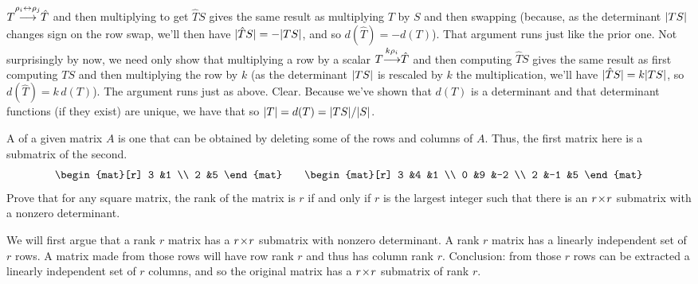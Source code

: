 \begin{exercises}
\begin{answer}
\begin{exparts}
          $
            T\smash[b]{\mathrel{ \mathop{\longrightarrow}\limits^{\rho_i\leftrightarrow\rho_j\mathstrut}_{ \begin{subarray}{l} \relax \end{subarray}}}}\hat{T}
          $
          and then multiplying to get \( \hat{T}S \) gives the same result as
          multiplying \( T \) by \( S \) and then swapping (because,
          as the determinant \( \deter{TS} \) changes sign on
          the row swap, we'll then have \( \deter{\hat{T}S}=-\deter{TS} \),
          and so \( d(\hat{T})=-d(T) \)).
          That argument runs just like the prior one.
        \partsitem Not surprisingly by now, we need only show that 
          multiplying a row by a scalar
          $
            T\smash[b]{\mathrel{ \mathop{\longrightarrow}\limits^{k\rho_i\mathstrut}_{ \begin{subarray}{l} \relax \end{subarray}}}}\hat{T}
          $
          and then computing \( \hat{T}S \) gives the same result as
          first computing \( TS \) and then multiplying the row by \( k \)
          (as the determinant \( \deter{TS} \) is rescaled by \( k \)
          the multiplication, we'll have \( \deter{\hat{T}S}=k\deter{TS} \),
          so \( d(\hat{T})=k\,d(T) \)).
          The argument runs just as above.
        \partsitem Clear.
        \partsitem Because we've shown that \( d(T) \) is a determinant
          and that determinant functions (if they exist) are
          unique, we have that
          so \( \deter{T}=d(T)=\deter{TS}/\deter{S} \).
      \end{exparts}  
    \end{answer}
  \item 
    A  
    of a given matrix $A$ is one that can be obtained by deleting 
    some of the rows and columns of $A$.
    Thus, the first matrix here is a submatrix of the second.
    \begin{equation*}
      \begin{mat}[r]
        3  &1  \\
        2  &5
      \end{mat}
      \qquad
      \begin{mat}[r]
        3  &4  &1  \\
        0  &9  &-2 \\
        2  &-1 &5
      \end{mat}
    \end{equation*}
    Prove that for any square matrix,
    the rank of the matrix is $r$ if and only if
    \( r \) is the largest
    integer such that there is an \( r \! \times \! r \) submatrix with a nonzero
    determinant.
    \begin{answer}
      We will first argue that a rank \( r \) matrix has a \( r \! \times \! r \)
      submatrix with nonzero determinant.
      A rank \( r \) matrix has a linearly independent set of \( r \) rows.
      A matrix made from those rows will have row rank \( r \) and thus has
      column rank \( r \).
      Conclusion: from those \( r \) rows can be extracted a linearly
      independent set of \( r \) columns, and so the original matrix has a
      \( r \! \times \! r \) submatrix of rank \( r \).


\end{answer}
\end{exercises}
